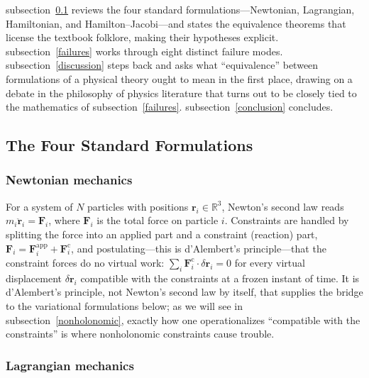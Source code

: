 subsection~\ref{standard} reviews the four standard formulations---Newtonian,
Lagrangian, Hamiltonian, and Hamilton--Jacobi---and states the equivalence
theorems that license the textbook folklore, making their hypotheses explicit.
subsection~\ref{failures} works through eight distinct failure modes.
subsection~\ref{discussion} steps back and asks what ``equivalence'' between
formulations of a physical theory ought to mean in the first place, drawing on
a debate in the philosophy of physics literature that turns out to be closely
tied to the mathematics of subsection~\ref{failures}.
subsection~\ref{conclusion} concludes.

\subsection{The Four Standard Formulations}
\label{standard}

\subsubsection{Newtonian mechanics}

For a system of $N$ particles with positions $\mathbf{r}_i \in \mathbb{R}^3$,
Newton's second law reads $m_i \ddot{\mathbf{r}}_i = \mathbf{F}_i$, where
$\mathbf{F}_i$ is the total force on particle $i$. Constraints are handled by
splitting the force into an applied part and a constraint (reaction) part,
$\mathbf{F}_i = \mathbf{F}_i^{\mathrm{app}} + \mathbf{F}_i^{\mathrm{c}}$, and
postulating---this is d'Alembert's principle---that the constraint forces do no
virtual work: $\sum_i \mathbf{F}_i^{\mathrm{c}}\cdot \delta \mathbf{r}_i = 0$
for every virtual displacement $\delta\mathbf{r}_i$ compatible with the
constraints at a frozen instant of time. It is d'Alembert's principle, not
Newton's second law by itself, that supplies the bridge to the variational
formulations below; as we will see in subsection~\ref{nonholonomic}, exactly
how one operationalizes ``compatible with the constraints'' is where
nonholonomic constraints cause trouble.

\subsubsection{Lagrangian mechanics}

